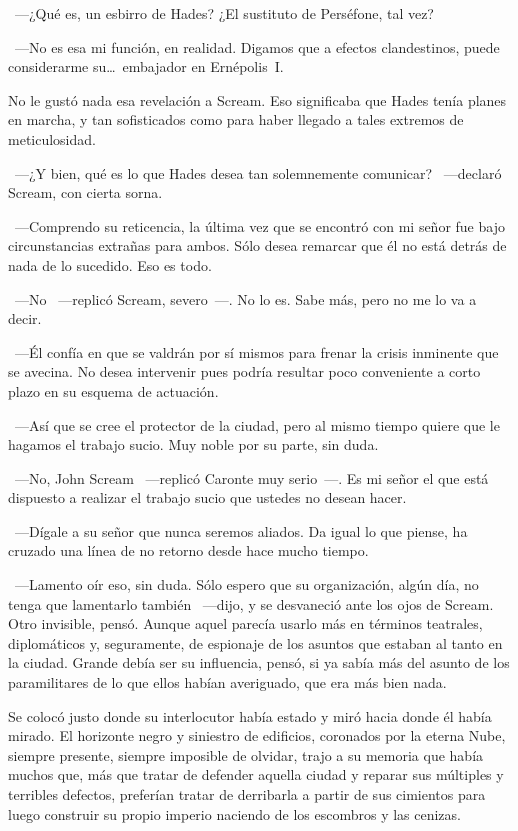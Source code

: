 ~---¿Qué es, un esbirro de Hades? ¿El sustituto de Perséfone, tal vez?

~---No es esa mi función, en realidad. Digamos que a efectos clandestinos, puede considerarme su\dots\ embajador en Ernépolis~I.

No le gustó nada esa revelación a Scream. Eso significaba que Hades tenía planes en marcha, y tan sofisticados como para haber llegado a tales extremos de meticulosidad.

~---¿Y bien, qué es lo que Hades desea tan solemnemente comunicar? ~---declaró Scream, con cierta sorna.

~---Comprendo su reticencia, la última vez que se encontró con mi señor fue bajo circunstancias extrañas para ambos. Sólo desea remarcar que él no está detrás de nada de lo sucedido. Eso es todo.

~---No ~---replicó Scream, severo~---. No lo es. Sabe más, pero no me lo va a decir.

~---Él confía en que se valdrán por sí mismos para frenar la crisis inminente que se avecina. No desea intervenir pues podría resultar poco conveniente a corto plazo en su esquema de actuación.

~---Así que se cree el protector de la ciudad, pero al mismo tiempo quiere que le hagamos el trabajo sucio. Muy noble por su parte, sin duda.

~---No, John Scream ~---replicó Caronte muy serio~---. Es mi señor el que está dispuesto a realizar el trabajo sucio que ustedes no desean hacer.

~---Dígale a su señor que nunca seremos aliados. Da igual lo que piense, ha cruzado una línea de no retorno desde hace mucho tiempo.

~---Lamento oír eso, sin duda. Sólo espero que su organización, algún día, no tenga que lamentarlo también ~---dijo, y se desvaneció ante los ojos de Scream. Otro invisible, pensó. Aunque aquel parecía usarlo más en términos teatrales, diplomáticos y, seguramente, de espionaje de los asuntos que estaban al tanto en la ciudad. Grande debía ser su influencia, pensó, si ya sabía más del asunto de los paramilitares de lo que ellos habían averiguado, que era más bien nada.

Se colocó justo donde su interlocutor había estado y miró hacia donde él había mirado. El horizonte negro y siniestro de edificios, coronados por la eterna Nube, siempre presente, siempre imposible de olvidar, trajo a su memoria que había muchos que, más que tratar de defender aquella ciudad y reparar sus múltiples y terribles defectos, preferían tratar de derribarla a partir de sus cimientos para luego construir su propio imperio naciendo de los escombros y las cenizas.

